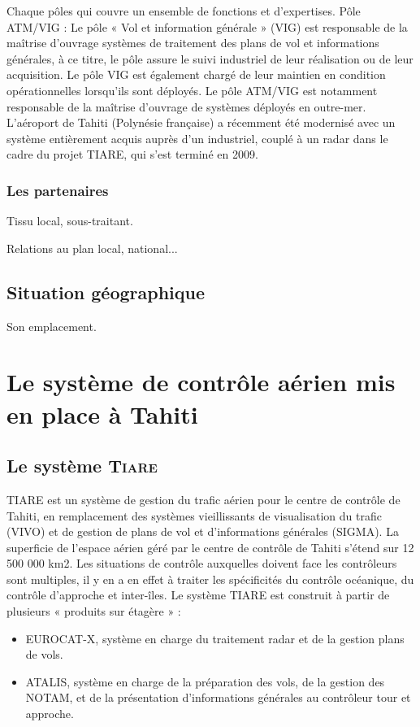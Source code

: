 Chaque pôles qui couvre un ensemble de fonctions et d’expertises.
Pôle ATM/VIG :
Le pôle « Vol et information générale » (VIG) est responsable de la maîtrise d’ouvrage systèmes de traitement des plans de vol et informations générales, à ce titre, le pôle assure le suivi industriel de leur réalisation ou de leur acquisition. Le pôle VIG est également chargé de leur maintien en condition opérationnelles lorsqu’ils sont déployés.
Le pôle ATM/VIG est notamment responsable de la maîtrise d’ouvrage de systèmes déployés en outre-mer. L’aéroport de Tahiti (Polynésie française) a récemment été modernisé avec un système entièrement acquis auprès d’un industriel, couplé à un radar dans le cadre du projet TIARE, qui s’est terminé en 2009.

    \subsubsection{Les partenaires}
        Tissu local, sous-traitant.
        
        Relations au plan local, national...

    \subsection{Situation géographique}
    
        Son emplacement.

\section[Contrôle aérien à Thaiti]{Le système de contrôle aérien mis en place à Tahiti}
    \subsection{Le système \textsc{Tiare}}
TIARE est un système de gestion du trafic aérien pour le centre de contrôle de Tahiti, en remplacement des systèmes vieillissants de visualisation du trafic (VIVO) et de gestion de plans de vol et d’informations générales (SIGMA). La superficie de l'espace aérien géré par le centre de contrôle de Tahiti s’étend sur 12 500 000 km2. Les situations de contrôle auxquelles doivent face les contrôleurs sont multiples, il y en a en effet à traiter les spécificités du contrôle océanique, du contrôle d’approche et inter-îles. Le système TIARE est construit à partir de plusieurs « produits sur étagère » :
\begin{itemize}
  \item EUROCAT-X, système en charge du traitement radar et de la gestion plans de vols.
  \item ATALIS, système en charge de la préparation des vols, de la gestion des NOTAM, et de la présentation d’informations générales au contrôleur tour et approche.
\end{itemize}\medskip

